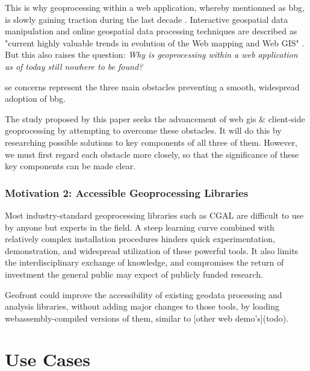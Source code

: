 This is why \ac{geoprocessing} within a web application, whereby mentionned as \ac{bbg}, is slowly gaining traction during the last decade \cite{kulawiak_analysis_2019, panidi_hybrid_2015, hamilton_client-side_2014}. Interactive geospatial data manipulation and online geospatial data processing techniques are described as "current highly valuable trends in evolution of the Web mapping and Web GIS" \cite{panidi_hybrid_2015}. But this also raises the question: \textit{Why is geoprocessing within a web application as of today still nowhere to be found?} 

se concerns represent the three main obstacles preventing a smooth, widespread adoption of \ac{bbg}. 

The study proposed by this paper seeks the advancement of web \ac{gis} \& client-side geoprocessing by attempting to overcome these obstacles. It will do this by researching possible solutions to key components of all three of them. However, we must first regard each obstacle more closely, so that the significance of these key components can be made clear. 

\subsubsection{Motivation 2: Accessible Geoprocessing Libraries}

Most industry-standard geoprocessing libraries such as CGAL are difficult to use by anyone but experts in the field. A steep learning curve combined with relatively complex installation procedures hinders quick experimentation, demonstration, and widespread utilization of these powerful tools. It also limits the interdisciplinary exchange of knowledge, and compromises the return of investment the general public may expect of publicly funded research.

Geofront could improve the accessibility of existing geodata processing and analysis libraries, without adding major changes to those tools, by loading webassembly-compiled versions of them, similar to [other web demo's](todo).











\section{Use Cases}

